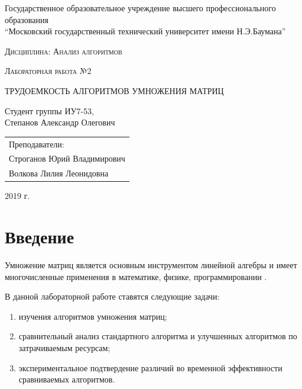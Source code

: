 \documentclass[a4paper,12pt]{article}
\newcommand{\anonsection}[1]{\section*{#1}\addcontentsline{toc}{section}{#1}}
\begin{document}
\begin{titlepage}

    \begin{center}
        \large
        Государственное образовательное учреждение высшего профессионального образования\\
        “Московский государственный технический университет имени Н.Э.Баумана”
        \vspace{3cm}

        \textsc{Дисциплина: Анализ алгоритмов}
        \vspace{0.5cm}

        \textsc{Лабораторная работа №2}
        \vspace{3cm}

        {\LARGE ТРУДОЕМКОСТЬ АЛГОРИТМОВ УМНОЖЕНИЯ МАТРИЦ}
        \vspace{3cm}

        Студент группы ИУ7-53,\\
        Степанов Александр Олегович
        \vfill
    \end{center}

    \begin{flushright}
        \begin{tabular}{l}
            Преподаватели:\\
            Строганов Юрий Владимирович\\
            Волкова Лилия Леонидовна
        \end{tabular}
    \end{flushright}

    \begin{center}

        2019 г.

    \end{center}

\end{titlepage}

\tableofcontents

\newpage
\anonsection{Введение}

Умножение матриц является основным инструментом линейной алгебры и имеет
многочисленные применения в математике, физике, программировании \cite{haskell}.

В данной лабораторной работе ставятся следующие задачи:

\begin{enumerate}
    \item изучения алгоритмов умножения матриц;
    \item сравнительный анализ стандартного алгоритма и улучшенных алгоритмов по
        затрачиваемым ресурсам;
    \item экспериментальное подтвердение различий во временной эффективности
        сравниваемых алгоритмов.
\end{enumerate}
\end{document}
